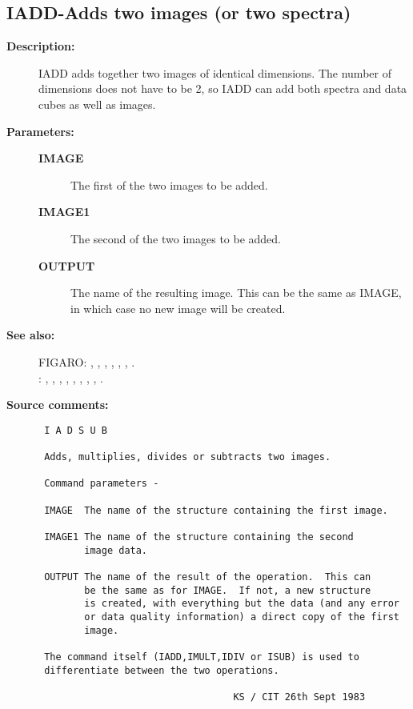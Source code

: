 \subsection{IADD-\label{IADD}Adds two images (or two spectra)}
\begin{description}

\item [{\bf Description:}]
 IADD adds together two images of identical dimensions.
 The number of dimensions does not have to be 2, so IADD
 can add both spectra and data cubes as well as images.

\item [{\bf Parameters:}]
\begin{description}
\item [{\bf IMAGE}]
 The first of the two images to be added.
\item [{\bf IMAGE1}]
 The second of the two images to be added.
\item [{\bf OUTPUT}]
 The name of the resulting image.  This can be the same
 as IMAGE, in which case no new image will be created.
\end{description}

\item [{\bf See also:}]
FIGARO: , , , , , , .\\
: , , , , , , , , .\\

\item [{\bf Source comments:}]
\begin{verbatim}
 I A D S U B

 Adds, multiplies, divides or subtracts two images.

 Command parameters -

 IMAGE  The name of the structure containing the first image.

 IMAGE1 The name of the structure containing the second
        image data.

 OUTPUT The name of the result of the operation.  This can
        be the same as for IMAGE.  If not, a new structure
        is created, with everything but the data (and any error
        or data quality information) a direct copy of the first
        image.

 The command itself (IADD,IMULT,IDIV or ISUB) is used to
 differentiate between the two operations.

                                  KS / CIT 26th Sept 1983
\end{verbatim}
\end{description}
